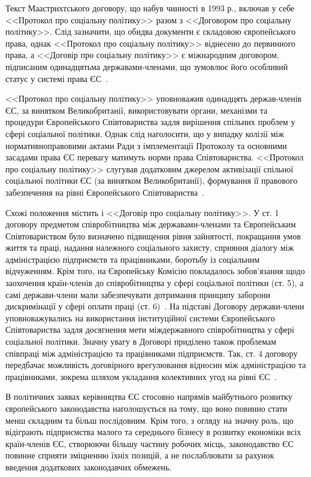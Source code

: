 Текст Маастрихтського договору, що набув чинності в 1993 р., включав у себе <<Протокол про соціальну політику>> разом з <<Договором про соціальну політику>>. 
Слід зазначити, що обидва документи є складовою європейського права, однак <<Протокол про соціальну політику>> віднесено до первинного права, а <<Договір про соціальну політику>> є міжнародним договором, підписаним одинадцятьма державами-членами, що зумовлює його особливий статус у системі права ЄС~\cite{Shashula2015}. 

<<Протокол про соціальну політику>> уповноважив одинадцять держав-членів ЄС, за винятком Великобританії, використовувати органи, механізми та процедури Європейського Співтовариства задля вирішення спільних проблем у сфері соціальної політики. 
Однак слід наголосити, що у випадку колізії між нормативноправовими актами Ради з імплементації Протоколу та основними засадами права ЄС перевагу матимуть норми права Співтовариства. 
<<Протокол про соціальну політику>> слугував додатковим джерелом активізації спільної соціальної політики ЄС (за винятком Великобританії), формування її правового забезпечення на рівні Європейського Співтовариства~\cite{Shashula2015}.

Схожі положення містить і <<Договір про соціальну політику>>.
У ст. 1 договору предметом співробітництва між державами-членами та Європейським Співтовариством було визначено підвищення рівня зайнятості, покращання умов життя та праці, надання належного соціального захисту, сприяння діалогу між адміністрацією підприємств та працівниками, боротьбу із соціальним відчуженням. 
Крім того, на Європейську Комісію покладалось зобов’язання щодо заохочення країн-членів до співробітництва у сфері соціальної політики (ст. 5), а самі держави-члени мали забезпечувати дотримання принципу заборони дискримінації у сфері оплати праці (ст. 6)~\cite{Forster2002}. 
На підставі Договору держави-члени уповноважувались на використання інституційної системи Європейського Співтовариства задля досягнення мети міждержавного співробітництва у сфері соціальної політики. 
Значну увагу в Договорі приділено також проблемам співпраці між адміністрацією та працівниками підприємств. 
Так, ст. 4 договору передбачає можливість договірного врегулювання відносин між адміністрацією та працівниками, зокрема шляхом укладання колективних угод на рівні ЄС~\cite{Shashula2015}. 

В політичних заявах керівництва ЄС стосовно напрямів майбутнього розвитку європейського законодавства наголошується на тому, що воно повинно стати менш складним та більш послідовним. 
Крім того, з огляду на значну роль, що відіграють підприємства малого та середнього бізнесу в розвитку економіки всіх країн-членів ЄС, створюючи більшу частину робочих місць, законодавство ЄС повинне сприяти зміцненню їхніх позицій, а не послаблювати за рахунок введення додаткових законодавчих обмежень. 

